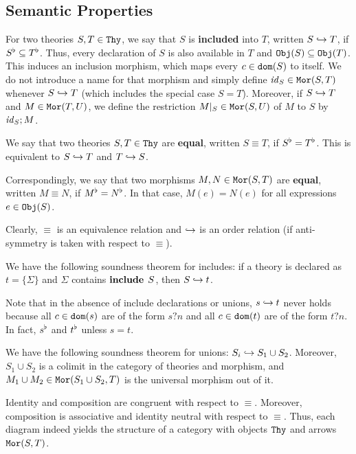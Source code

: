 \begin{modexp}
\subsection{Semantic Properties}

For two theories $S,T\in\mathtt{Thy}$, we say that $S$ is \textbf{included} into $T$, written $S\hookrightarrow T$, if $S^\flat\subseteq T^\flat$.
Thus, every declaration of $S$ is also available in $T$ and $\mathtt{Obj}(S)\subseteq\mathtt{Obj}(T)$.
This induces an inclusion morphism, which maps every $c\in\mathtt{dom}(S)$ to itself.
We do not introduce a name for that morphism and simply define $\mathit{id}_{S}\in\mathtt{Mor}(S,T)$ whenever $S\hookrightarrow T$ (which includes the special case $S=T$).
Moreover, if $S\hookrightarrow T$ and $M\in\mathtt{Mor}(T,U)$, we define the restriction $M|_S\in\mathtt{Mor}(S,U)$ of $M$ to $S$ by $\mathit{id}_{S};M$.

We say that two theories $S,T\in\mathtt{Thy}$ are \textbf{equal}, written $S\equiv T$, if $S^\flat=T^\flat$.
This is equivalent to $S\hookrightarrow T$ and $T\hookrightarrow S$.

Correspondingly, we say that two morphisms $M,N\in\mathtt{Mor}(S,T)$ are \textbf{equal}, written $M\equiv N$, if $M^\flat=N^\flat$.
In that case, $M(e)=N(e)$ for all expressions $e\in\mathtt{Obj}(S)$.

Clearly, $\equiv$ is an equivalence relation and $\hookrightarrow$ is an order relation (if anti-symmetry is taken with respect to $\equiv$).

\begin{example}\label{rel:incl}
We have the following soundness theorem for includes: if a theory is declared as $t=\{\Sigma\}$ and $\Sigma$ contains $\operatorname{\mathbf{include}}{\;S}$, then $S\hookrightarrow t$.

Note that in the absence of include declarations or unions, $s\hookrightarrow t$ never holds because all $c\in\mathtt{dom}(s)$ are of the form $s?n$ and all $c\in\mathtt{dom}(t)$ are of the form $t?n$.
In fact, $s^\flat$ and $t^\flat$ unless $s=t$.
\end{example}

\begin{union}
\begin{example}\label{rel:union}
We have the following soundness theorem for unions: $S_i\hookrightarrow S_1\cup S_2$.
Moreover, $S_1\cup S_2$ is a colimit in the category of theories and morphism, and $M_1\cup M_2\in\mathtt{Mor}(S_1\cup S_2,T)$ is the universal morphism out of it.
\end{example}
\end{union}

\begin{example}\label{rel:cat}
Identity and composition are congruent with respect to $\equiv$.
Moreover, composition is associative and identity neutral with respect to $\equiv$.
Thus, each diagram indeed yields the structure of a category with objects $\mathtt{Thy}$ and arrows $\mathtt{Mor}(S,T)$.
\end{example}
\end{modexp}